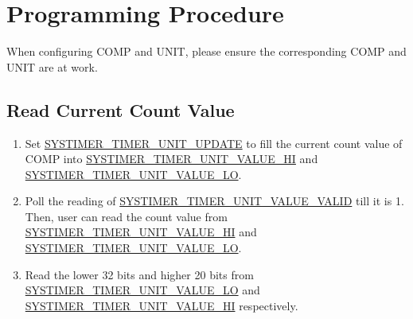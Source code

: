 \documentclass[main\_\_EN.tex]{subfiles}
\begin{document}
\section{Programming Procedure}\label{sec:instructions-of-usage}
When configuring COMP and UNIT, please ensure the corresponding COMP and UNIT are at work.
\subsection{Read Current Count Value}\label{sec:to-read-system-timer-value}
\begin{enumerate}
    \item Set \hyperref[fielddesc:SYSTIMERTIMERUNIT0UPDATE]{SYSTIMER\_TIMER\_UNIT\_UPDATE} to fill the current count value of COMP into \hyperref[fielddesc:SYSTIMERTIMERUNIT0VALUEHI]{SYSTIMER\_TIMER\_UNIT\_VALUE\_HI} and \hyperref[fielddesc:SYSTIMERTIMERUNIT0VALUELO]{SYSTIMER\_TIMER\_UNIT\_VALUE\_LO}.
    \item Poll the reading of \hyperref[fielddesc:SYSTIMERTIMERUNIT0VALUEVALID]{SYSTIMER\_TIMER\_UNIT\_VALUE\_VALID} till it is 1. Then, user can read the count value from \hyperref[fielddesc:SYSTIMERTIMERUNIT0VALUEHI]{SYSTIMER\_TIMER\_UNIT\_VALUE\_HI} and \hyperref[fielddesc:SYSTIMERTIMERUNIT0VALUELO]{SYSTIMER\_TIMER\_UNIT\_VALUE\_LO}.
    \item Read the lower 32 bits and higher 20 bits from \hyperref[fielddesc:SYSTIMERTIMERUNIT0VALUELO]{SYSTIMER\_TIMER\_UNIT\_VALUE\_LO} and \hyperref[fielddesc:SYSTIMERTIMERUNIT0VALUEHI]{SYSTIMER\_TIMER\_UNIT\_VALUE\_HI} respectively.
\end{enumerate}
\end{document}
